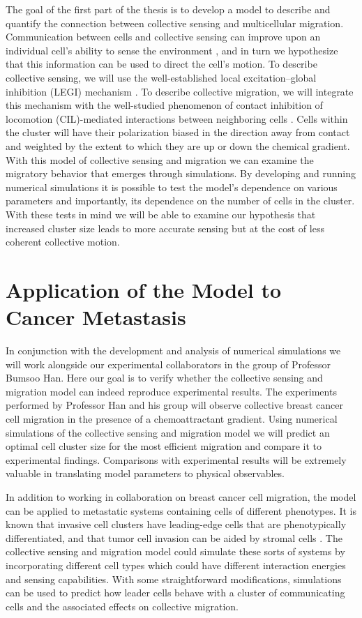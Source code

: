 \documentclass[phys,prelim]{puthesis}
\begin{document}
The goal of the first part of the thesis is to develop a model to describe and quantify the connection between collective sensing and multicellular migration. Communication between cells and collective sensing can improve upon an individual cell's ability to sense the environment \cite{ellison2015cell}, and in turn we hypothesize that this information can be used to direct the cell's motion. To describe collective sensing, we will use the well-established local excitation--global inhibition (LEGI) mechanism \cite{levchenko2002models,mugler2015limits}. To describe collective migration, we will integrate this mechanism with the well-studied phenomenon of contact inhibition of locomotion (CIL)-mediated interactions between neighboring cells \cite{mayor2010keeping}. Cells within the cluster will have their polarization biased in the direction away from contact and weighted by the extent to which they are up or down the chemical gradient. With this model of collective sensing and migration we can examine the migratory behavior that emerges through simulations. By developing and running numerical simulations it is possible to test the model's dependence on various parameters and importantly, its dependence on the number of cells in the cluster. With these tests in mind we will be able to examine our hypothesis that increased cluster size leads to more accurate sensing but at the cost of less coherent collective motion.

\section{Application of the Model to Cancer Metastasis}

In conjunction with the development and analysis of numerical simulations we will work alongside our experimental collaborators in the group of Professor Bumsoo Han. Here our goal is to verify whether the collective sensing and migration model can indeed reproduce experimental results. The experiments performed by Professor Han and his group will observe collective breast cancer cell migration in the presence of a chemoattractant gradient. Using numerical simulations of the collective sensing and migration model we will predict an optimal cell cluster size for the most efficient migration and compare it to experimental findings. Comparisons with experimental results will be extremely valuable in translating model parameters to physical observables.

In addition to working in collaboration on breast cancer cell migration, the model can be applied to metastatic systems containing cells of different phenotypes. It is known that invasive cell clusters have leading-edge cells that are phenotypically differentiated, and that tumor cell invasion can be aided by stromal cells \cite{cheung2013collective,gaggioli2007fibroblast,gray2010cellular}. The collective sensing and migration model could simulate these sorts of systems by incorporating different cell types which could have different interaction energies and sensing capabilities. With some straightforward modifications, simulations can be used to predict how leader cells behave with a cluster of communicating cells and the associated effects on collective migration.
\end{document}
